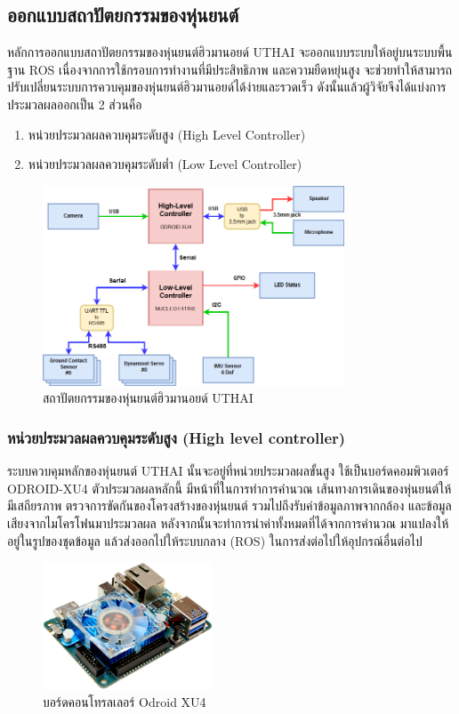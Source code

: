 \subsection{ออกแบบสถาปัตยกรรมของหุ่นยนต์}
หลักการออกแบบสถาปัตยกรรมของหุ่นยนต์ฮิวมานอยด์ UTHAI จะออกแบบระบบให้อยู่บนระบบพื้นฐาน ROS
เนื่องจากการใช้กรอบการทำงานที่มีประสิทธิภาพ และความยืดหยุ่นสูง จะช่วยทำให้สามารถปรับเปลี่ยนระบบการควบคุมของหุ่นยนต์ฮิวมานอยด์ได้ง่ายและรวดเร็ว
ดังนั้นแล้วผู้วิจัยจึงได้แบ่งการประมวลผลออกเป็น 2 ส่วนคือ
\begin{enumerate}[label=\arabic*, leftmargin=1.5cm]\setlength\itemsep{-0.25em}
	\item หน่วยประมวลผลควบคุมระดับสูง (High Level Controller)
	\item หน่วยประมวลผลควบคุมระดับต่ำ (Low Level Controller)
\end{enumerate}
\begin{figure}[ht]
	\centering
	\includegraphics[width=0.8\textwidth]{chapter3/images/uthai_argitec.png}
	\caption{สถาปัตยกรรมของหุ่นยนต์ฮิวมานอยด์ UTHAI}
	\label{fig:uthai_argitec}
\end{figure}

\clearpage
\subsubsection{หน่วยประมวลผลควบคุมระดับสูง (High level controller)}
ระบบควบคุมหลักของหุ่นยนต์ UTHAI นั้นจะอยู่ที่หน่วยประมวลผลขั้นสูง ใช้เป็นบอร์ดคอมพิวเตอร์ ODROID-XU4 ตัวประมวลผลหลักนี้
มีหน้าที่ในการทำการคำนวณ เส้นทางการเดินของหุ่นยนต์ให้มีเสถียรภาพ ตรวจการขัดกันของโครงสร้างของหุ่นยนต์
รวมไปถึงรับค่าข้อมูลภาพจากกล้อง และข้อมูลเสียงจากไมโครโฟนมาประมวลผล หลังจากนั้นจะทำการนำค่าทั้งหมดที่ได้จากการคำนวณ
มาแปลงให้อยู่ในรูปของชุดข้อมูล แล้วส่งออกไปให้ระบบกลาง (ROS) ในการส่งต่อไปให้อุปกรณ์อื่นต่อไป

\begin{figure}[ht]
	\centering
	\includegraphics[width=0.45\textwidth]{chapter3/images/odroid_xu4.jpeg}
	\caption{บอร์ดคอนโทรลเลอร์ Odroid XU4}
	\label{fig:controller_xu4}
\end{figure}

